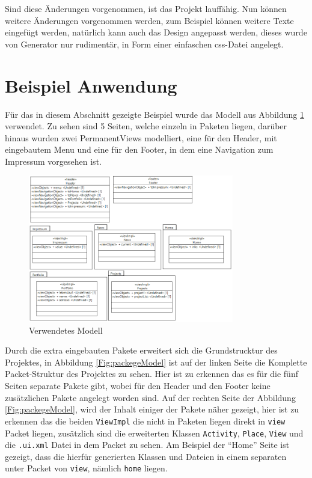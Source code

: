 Sind diese Änderungen vorgenommen, ist das Projekt lauffähig. Nun können weitere
Änderungen vorgenommen werden, zum Beispiel können weitere Texte eingefügt
werden, natürlich kann auch das Design angepasst werden, dieses wurde von
Generator nur rudimentär, in Form einer einfaschen css-Datei angelegt.

\section{Beispiel Anwendung}
Für das in diesem Abschnitt gezeigte Beispiel wurde das Modell aus Abbildung
\ref{Fig:ergModell} verwendet. Zu sehen sind 5 Seiten, welche einzeln in
Paketen liegen, darüber hinaus wurden zwei PermanentViews modelliert, eine für
den Header, mit eingebautem Menu und eine für den Footer, in dem eine Navigation
zum Impressum vorgesehen ist.

\begin{figure}[htbp]
\begin{center}
\includegraphics[width=0.8\textwidth]{./img/Model2.png}
\caption{Verwendetes Modell}\label{Fig:ergModell}
\end{center}
\end{figure}

Durch die extra eingebauten Pakete erweitert sich die Grundstrucktur des
Projektes, in Abbildung \ref{Fig:packegeModel} ist auf der linken Seite die
Komplette Packet-Struktur des Projektes zu sehen. Hier ist zu erkennen das es
für die fünf Seiten separate Pakete gibt, wobei für den Header und den Footer
keine zusätzlichen Pakete angelegt worden sind. Auf der rechten Seite der
Abbildung \ref{Fig:packegeModel}, wird der Inhalt einiger der Pakete näher
gezeigt, hier ist zu erkennen das die beiden \texttt{ViewImpl} die nicht in
Paketen liegen direkt in \texttt{view} Packet liegen, zusätzlich sind die erweiterten
Klassen \texttt{Activity}, \texttt{Place}, \texttt{View} und die
\texttt{.ui.xml} Datei in dem Packet zu sehen. Am Beispiel der "`Home"' Seite
ist gezeigt, dass die hierfür generierten Klassen und Dateien in einem separaten
unter Packet von \texttt{view}, nämlich \texttt{home} liegen.

